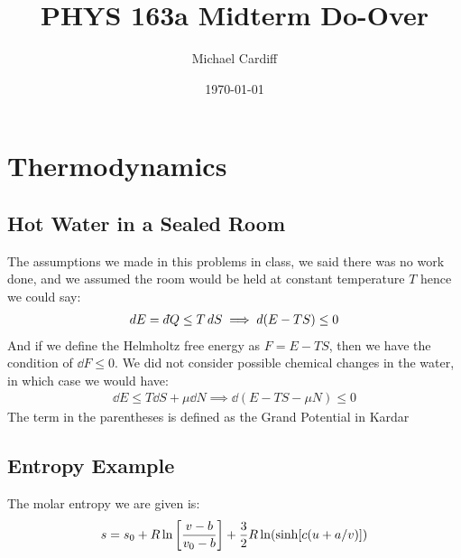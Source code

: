 \documentclass[12pt]{article}
\title{\vspace{-3em}PHYS 163a Midterm Do-Over}
\author{Michael Cardiff}
\date{\today}
\newcommand{\dbar}{d\hspace*{-0.08em}\bar{}\hspace*{0.1em}}
\begin{document}
\maketitle

\section{Thermodynamics}
\subsection{Hot Water in a Sealed Room}
The assumptions we made in this problems in class, we said there was no work done, and we assumed the room would be held at constant temperature $T$ hence we could say:
\begin{align*}
  \dd{E}=\dbar{Q}\leq T\dd{S}\implies \dd{(E-TS)}\leq0
\end{align*}
And if we define the Helmholtz free energy as $F=E-TS$, then we have the condition of $\dd{F}\leq0$.
We did not consider possible chemical changes in the water, in which case we would have:
\begin{align*}
  \dd{E}\leq T\dd{S}+\mu\dd{N}\implies\dd{(E-TS-\mu N)}\leq0
\end{align*}
The term in the parentheses is defined as the Grand Potential in Kardar
\subsection{Entropy Example}
The molar entropy we are given is:
\begin{align*}
  s=s_0+R\ln\qty[\frac{v-b}{v_0-b}]+\frac32R\ln(\sinh[c(u+a/v)])
\end{align*}
\end{document}
